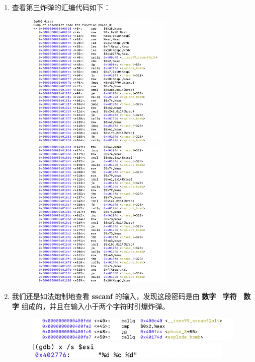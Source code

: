         \begin{enumerate}
            \item 查看第三炸弹的汇编代码如下：
                \begin{figure}[htbp]
                    \centering
                    \includegraphics*[width = 7cm]{s3_0_0.png}
                    \includegraphics*[width = 7cm]{s3_0_1.png}
                \end{figure}
            \item 我们还是如法炮制地查看 \textbf{sscanf} 的输入，发现这段密码是由 \textbf{数字 \ 字符 \ 数字} 组成的，并且在输入小于两个字符时引爆炸弹。
                \begin{figure}[htbp]
                    \hspace*{1cm}
                    \includegraphics*[width = 12cm]{s3_1_1.png} \\ 
                    \hspace*{1.5cm}
                    \includegraphics*[width = 10cm]{s3_1.png}

\end{figure}
\end{enumerate}
